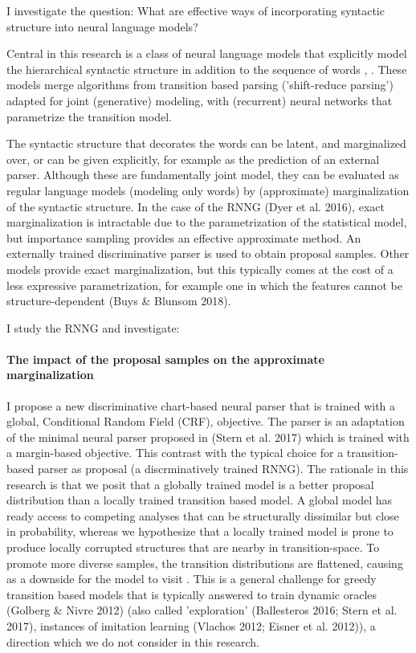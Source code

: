 

I investigate the question: What are effective ways of incorporating syntactic structure into neural language models?

Central in this research is a class of neural language models that explicitly model the hierarchical syntactic structure in addition to the sequence of words \citep{Dyer+2016:RNNG}, \cite{Buys+2015:neural-gen-dep} \cite{Buys+2018}. These models merge algorithms from transition based parsing ('shift-reduce parsing') adapted for joint (generative) modeling, with (recurrent) neural networks that parametrize the transition model.

The syntactic structure that decorates the words can be latent, and marginalized over, or can be given explicitly, for example as the prediction of an external parser. Although these are fundamentally joint model, they can be evaluated as regular language models (modeling only words) by (approximate) marginalization of the syntactic structure. In the case of the RNNG (Dyer et al. 2016), exact marginalization is intractable due to the parametrization of the statistical model, but importance sampling provides an effective approximate method. An externally trained discriminative parser is used to obtain proposal samples. Other models provide exact marginalization, but this typically comes at the cost of a less expressive parametrization, for example one in which the features cannot be structure-dependent (Buys \& Blunsom 2018).

I study the RNNG and investigate:

\paragraph{The impact of the proposal samples on the approximate marginalization}
I propose a new discriminative chart-based neural parser that is trained with a global, Conditional Random Field (CRF), objective. The parser is an adaptation of the minimal neural parser proposed in (Stern et al. 2017) which is trained with a margin-based objective. This contrast with the typical choice for a transition-based parser as proposal (a discrminatively trained RNNG). The rationale in this research is that we posit that a globally trained model is a better proposal distribution than a locally trained transition based model. A global model has ready access to competing analyses that can be structurally dissimilar but close in probability, whereas we hypothesize that a locally trained model is prone to produce locally corrupted structures that are nearby in transition-space. To promote more diverse samples, the transition distributions are flattened, causing as a downside for the model to visit . This is a general challenge for greedy transition based models that is typically answered to train dynamic oracles (Golberg \& Nivre 2012) (also called 'exploration' (Ballesteros 2016; Stern et al. 2017), instances of imitation learning (Vlachos 2012; Eisner et al. 2012)), a direction which we do not consider in this research.

